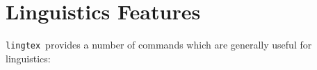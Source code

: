 \documentclass{article}
\def\lingtex{\texttt{lingtex}}
\begin{document}

\section{Linguistics Features} \label{sec:linguistics-features}

\lingtex\ provides a number of commands which are generally useful for linguistics:
\end{document}
